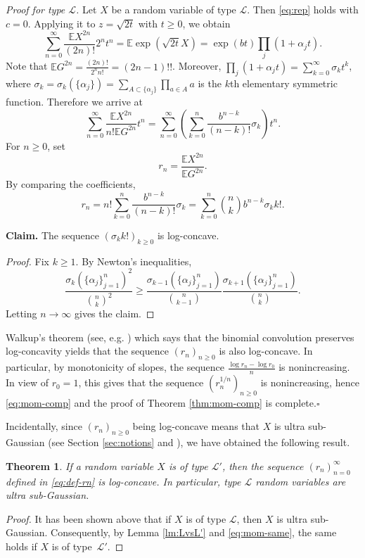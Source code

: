 \documentclass[10pt]{article}
\newcommand{\E}{\mathbb{E}}
\newcommand{\1}{\textbf{1}}
\newcommand{\sL}{\mathscr{L}}
\newtheorem{theorem}{Theorem}
\theoremstyle{remark}
\theoremstyle{definition}
\begin{document}
\emph{Proof for type $\mathscr{L}$.}
Let $X$ be a random variable of type $\mathscr{L}$. Then \eqref{eq:rep} holds with $c = 0$. Applying it to $z = \sqrt{2t}$ with $t \geq 0$, we obtain
\[
\sum_{n=0}^\infty \frac{\E X^{2n}}{(2n)!}2^nt^n = \E\exp(\sqrt{2t}X) = \exp(bt)\prod_j (1+\alpha_jt).
\]
Note that $\E G^{2n} = \frac{(2n)!}{2^nn!} = (2n-1)!!$. Moreover, $\prod_j (1+\alpha_j t) = \sum_{k=0}^\infty \sigma_kt^k$, where $\sigma_k = \sigma_k(\{\alpha_j\}) = \sum_{A \subset \{\alpha_j\}}\prod_{a \in A} a$ is the $k$th elementary symmetric function. Therefore we arrive at
\[
\sum_{n=0}^\infty \frac{\E X^{2n}}{n!\E G^{2n}} t^n = \sum_{n=0}^\infty \left(\sum_{k=0}^n \frac{b^{n-k}}{(n-k)!}\sigma_{k} \right) t^n.
\]
For $n \geq 0$, set
\begin{equation}\label{eq:def-rn}
r_n = \frac{\E X^{2n}}{\E G^{2n}}.
\end{equation}
By comparing the coefficients,
\[
r_n = n!\sum_{k=0}^n \frac{b^{n-k}}{(n-k)!}\sigma_{k} = \sum_{k=0}^n \binom{n}{k} b^{n-k}\sigma_{k}k!.
\]

\textbf{Claim.} The sequence $(\sigma_kk!)_{k \geq 0}$ is log-concave.
\begin{proof}
Fix $k \geq 1$. By Newton's inequalities,
\[
\frac{\sigma_k(\{\alpha_j\}_{j=1}^n)^2}{\binom{n}{k}^2} \geq \frac{\sigma_{k-1}(\{\alpha_j\}_{j=1}^n)}{\binom{n}{k-1}}\frac{\sigma_{k+1}(\{\alpha_j\}_{j=1}^n)}{\binom{n}{k}}.
\]
Letting $n\to\infty$ gives the claim.
\end{proof}


Walkup's theorem (see, e.g. \cite{Gur2, Lig, NO, W}) which says that the binomial convolution preserves log-concavity yields that the sequence $(r_n)_{n \geq 0}$ is also log-concave. In particular, by monotonicity of slopes, the sequence $\frac{\log r_n-\log r_0}{n}$ is nonincreasing. In view of $r_0 = 1$, this gives that the sequence $(r_n^{1/n})_{n\geq 0}$ is nonincreasing, hence \eqref{eq:mom-comp} and the proof of Theorem \ref{thm:mom-comp} is complete.\hfill$\square$


Incidentally, since $(r_n)_{n \geq 0}$ being log-concave means that $X$ is ultra sub-Gaussian (see Section \ref{sec:notions} and \cite{NO}), we have obtained the following result.

\begin{theorem}\label{thm:type-L-USG}
If a random variable $X$ is of type $\sL'$, then the sequence $(r_n)_{n=0}^\infty$ defined in \eqref{eq:def-rn} is log-concave. In particular, type $\sL$ random variables are ultra sub-Gaussian.
\end{theorem}
\begin{proof}
It has been shown above that if $X$ is of type $\sL$, then $X$ is ultra sub-Gaussian. Consequently, by Lemma \ref{lm:LvsL'} and \eqref{eq:mom-same}, the same holds if $X$ is of type~$\sL'$.
\end{proof}
\end{document}
